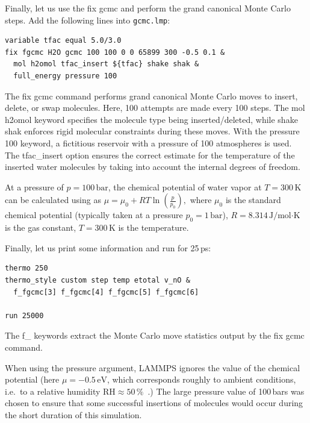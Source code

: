 \documentclass[9pt,tutorial]{livecoms}
\newcommand{\lmpcmd}[1]{\colorbox{listing}{\textcolor{command}{\small{#1}}}} %
\newcommand{\flecmd}[1]{\textcolor{command}{\texttt{#1}}} %
\begin{document}
Finally, let us use the \lmpcmd{fix gcmc} and perform the grand canonical Monte
Carlo steps.  Add the following lines into \flecmd{gcmc.lmp}:
\begin{lstlisting}
variable tfac equal 5.0/3.0
fix fgcmc H2O gcmc 100 100 0 0 65899 300 -0.5 0.1 &
  mol h2omol tfac_insert ${tfac} shake shak &
  full_energy pressure 100
\end{lstlisting}
{\color{blue}The \lmpcmd{fix gcmc} command performs grand canonical Monte Carlo
moves to insert, delete, or swap molecules. Here, 100 attempts are made every
100 steps.  The \lmpcmd{mol h2omol} keyword specifies the
molecule type being inserted/deleted, while \lmpcmd{shake shak} enforces rigid
molecular constraints during these moves. With the \lmpcmd{pressure 100} keyword,
a fictitious reservoir with a pressure of 100 atmospheres is used.}
The \lmpcmd{tfac\_insert} option ensures the correct estimate for the temperature
of the inserted water molecules by taking into account the internal degrees of
freedom.

\begin{note}
At a pressure of $p = 100\,\text{bar}$, the chemical potential of water vapor at $T = 300\,\text{K}$
can be calculated using as $\mu = \mu_0 + RT \ln (\frac{p}{p_0}),$ where $\mu_0$ is the standard
chemical potential (typically taken at a pressure $p_0 = 1 \, \text{bar}$), $R = 8.314\, \text{J/mol·K}$
is the gas constant, $T = 300\,\text{K}$ is the temperature.
\end{note}

Finally, let us print some information and run for 25\,ps:
\begin{lstlisting}
thermo 250
thermo_style custom step temp etotal v_nO &
  f_fgcmc[3] f_fgcmc[4] f_fgcmc[5] f_fgcmc[6]

run 25000
\end{lstlisting}
{\color{blue}The \lmpcmd{f\_} keywords extract the Monte Carlo move statistics
output by the \lmpcmd{fix gcmc} command.}

\begin{note}
When using the pressure argument, LAMMPS ignores the value of the
chemical potential (here $\mu = -0.5\,\text{eV}$, which corresponds roughly to
ambient conditions, i.e.~to a relative humidity $\text{RH} \approx 50\,\%$~\cite{gravelle2020multi}.)
The large pressure value of 100\,bars was chosen to ensure that some successful
insertions of molecules would occur during the short duration of this simulation.
\end{note}
\end{document}
